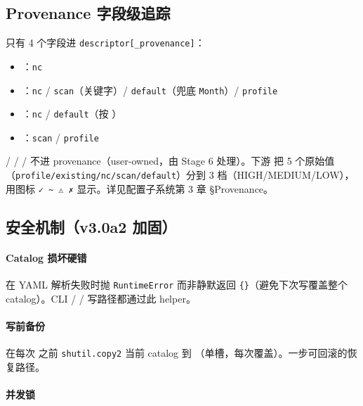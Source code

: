 \subsection{Provenance 字段级追踪}

只有 4 个字段进 \texttt{descriptor[\_provenance]}：

\begin{itemize}
  \item {}：\texttt{nc}
  \item {}：\texttt{nc} / \texttt{scan}（关键字）/ \texttt{default}（兜底 \texttt{Month}）/ \texttt{profile}
  \item {}：\texttt{nc} / \texttt{default}（按 ）
  \item {}：\texttt{scan} / \texttt{profile}
\end{itemize}

 /  /  /  不进 provenance（user-owned，由 Stage 6 处理）。下游  把 5 个原始值（\texttt{profile/existing/nc/scan/default}）分到 3 档（HIGH/MEDIUM/LOW）， 用图标 \texttt{✓ \textasciitilde\ ⚠ ✗} 显示。详见配置子系统第 3 章 §Provenance。

\subsection{安全机制（v3.0a2 加固）}

\paragraph{Catalog 损坏硬错}

 在 YAML 解析失败时抛 \texttt{RuntimeError} 而非静默返回 \texttt{\{\}}（避免下次写覆盖整个 catalog）。CLI  /  /  写路径都通过此 helper。

\paragraph{写前备份}

 在每次  之前 \texttt{shutil.copy2} 当前 catalog 到 （单槽，每次覆盖）。一步可回滚的恢复路径。

\paragraph{并发锁}

